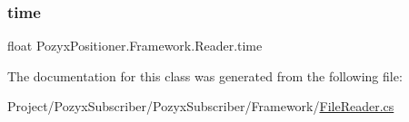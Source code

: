 \mbox{\label{class_pozyx_positioner_1_1_framework_1_1_reader_a0b277d104268d75fa8c84fa407ac505c}} 
\subsubsection{\texorpdfstring{time}{time}}
{\footnotesize\ttfamily float Pozyx\+Positioner.\+Framework.\+Reader.\+time\hspace{0.3cm}{\ttfamily [private]}}



The documentation for this class was generated from the following file\+:\begin{DoxyCompactItemize}
\item 
Project/\+Pozyx\+Subscriber/\+Pozyx\+Subscriber/\+Framework/\hyperlink{_file_reader_8cs}{File\+Reader.\+cs}\end{DoxyCompactItemize}

